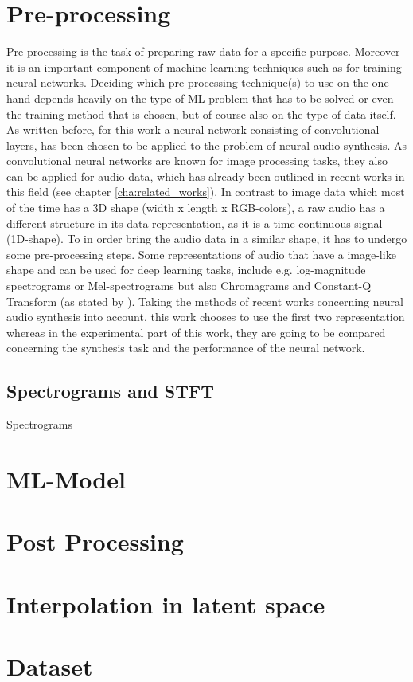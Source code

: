 \section{Pre-processing}
\label{sec:app_pre-processing}
Pre-processing is the task of preparing raw data for a specific purpose. Moreover it is an important component of machine learning techniques such as for training neural networks. Deciding which pre-processing technique(s) to use on the one hand depends heavily on the type of ML-problem that has to be solved or even the training method that is chosen, but of course also on the type of data itself. As written before, for this work a neural network consisting of convolutional layers, has been chosen to be applied to the problem of neural audio synthesis. As convolutional neural networks are known for image processing tasks, they also can be applied for audio data, which has already been outlined in recent works in this field (see chapter \ref{cha:related_works}). In contrast to image data which most of the time has a 3D shape (width x length x RGB-colors), a raw audio has a different structure in its data representation, as it is a time-continuous signal (1D-shape). To in order bring the audio data in a similar shape, it has to undergo some pre-processing steps. Some representations of audio that have a image-like shape and can be used for deep learning tasks, include e.g. log-magnitude spectrograms or Mel-spectrograms but also Chromagrams and Constant-Q Transform (as stated by \cite{choi2018tutorial}). Taking the methods of recent works concerning neural audio synthesis into account, this work chooses to use the first two representation whereas in the experimental part of this work, they are going to be compared concerning the synthesis task and the performance of the neural network. 

\subsection{Spectrograms and STFT}
Spectrograms 



\section{ML-Model}
\label{sec:app_model}

\section{Post Processing}
\label{sec:app_sec_post_processing}

\section{Interpolation in latent space}
\label{sec:app_interpolation}

\section{Dataset}
\label{sec:app_dataset}